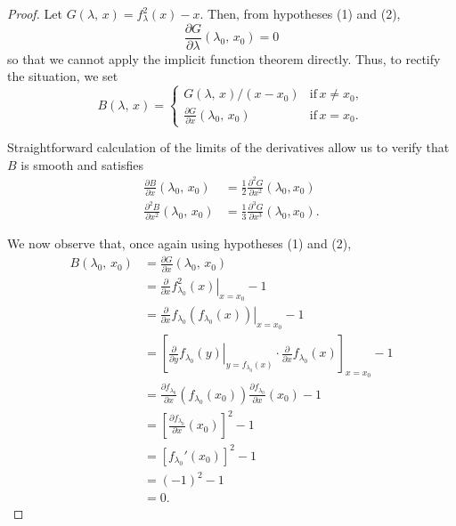 \documentclass[10pt,twoside,titlepage]{book}
\numberwithin{equation}{chapter}
\numberwithin{figure}{chapter}
\numberwithin{table}{chapter}
\theoremstyle{plain}%
\theoremstyle{definition}
\theoremstyle{remark}
\begin{document}
\begin{proof}
	Let $G(\lambda,\, x)=f^2_{\lambda}(x)-x$. Then, from hypotheses (1) and (2),
	\[\frac{\partial G}{\partial\lambda}(\lambda_0,\,x_0)=0\]
	so that we cannot apply the implicit function theorem directly. Thus, to rectify the situation, we set
	\begin{equation}
		B(\lambda,\,x)=
		\begin{cases}
			G(\lambda,\,x)/(x-x_0) & \mathrm{if}\,x\neq x_0,\\
			\frac{\partial G}{\partial x}(\lambda_0,\,x_0) & \mathrm{if}\,x=x_0.
		\end{cases}
	\end{equation}
	
	Straightforward calculation of the limits of the derivatives allow us to verify that $B$ is smooth and satisfies
	\begin{equation}
		\begin{aligned}
			\frac{\partial B}{\partial x}(\lambda_0,\,x_0)		& =\frac{1}{2}\frac{\partial^2 G}{\partial x^2}(\lambda_0,x_0)\\
			\frac{\partial^2 B}{\partial x^2}(\lambda_0,\,x_0)	& =\frac{1}{3}\frac{\partial^3 G}{\partial x^3}(\lambda_0,x_0).
		\end{aligned}
	\end{equation}
	
	We now observe that, once again using hypotheses (1) and (2),
	\begin{equation}
		\label{eq:Bl0x0}
		\begin{aligned}
			B(\lambda_0,\,x_0) 	& =\frac{\partial G}{\partial x}(\lambda_0,\,x_0)\\
			& =\left.\frac{\partial}{\partial x}f^2_{\lambda_0}(x)\right|_{x=x_0}-1\\
			& =\left.\frac{\partial}{\partial x}f_{\lambda_0}\left(f_{\lambda_0}(x)\right)\right|_{x=x_0}-1\\
			& =\left[\left.\frac{\partial}{\partial y}f_{\lambda_0}(y)\right|_{y=f_{\lambda_0}(x)}\cdot\frac{\partial}{\partial x}f_{\lambda_0}(x)\right]_{x=x_0}-1\\
			& =\frac{\partial f_{\lambda_0}}{\partial x}(f_{\lambda_0}(x_0))\frac{\partial f_{\lambda_0}}{\partial x}(x_0)-1\\
			& =\left[\frac{\partial f_{\lambda_0}}{\partial x}(x_0)\right]^2-1\\
			& =\left[f_{\lambda_0}'(x_0)\right]^2-1\\
			& =(-1)^2-1\\
			& =0.
		\end{aligned}
	\end{equation}
	

\end{proof}
\end{document}
